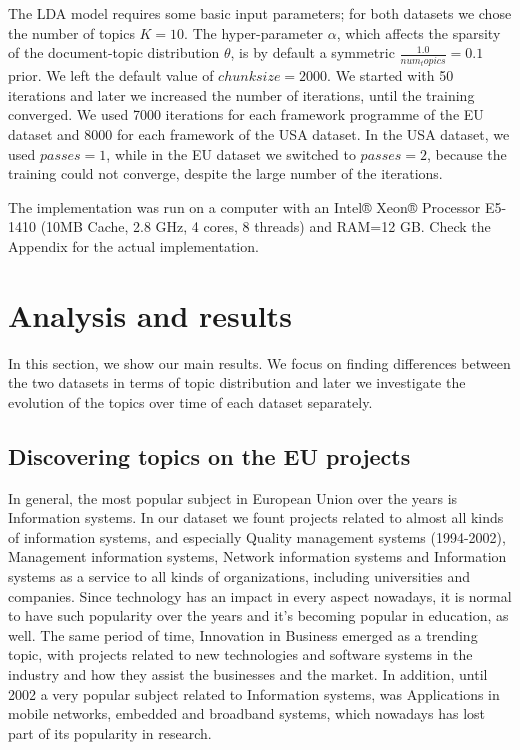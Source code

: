 \documentclass[12pt]{report}
\begin{document}
The LDA model requires some basic input parameters; for both datasets we chose
the number of topics $K=10$. The hyper-parameter $\alpha$, which affects the
sparsity of the document-topic distribution $\theta$, is by default a symmetric
$\frac{1.0}{num_topics} = 0.1$ prior. We left the default value of $chunksize=2000$. We
started with 50 iterations and later we increased the number of iterations,
until the training converged. We used 7000 iterations for each framework
programme of the EU dataset and 8000 for each framework of the USA dataset. In
the USA dataset, we used $passes=1$, while in the EU dataset we switched to
$passes=2$, because the training could not converge, despite the large number of
the iterations.

The implementation was run on a computer with an Intel® Xeon® Processor E5-1410
(10MB Cache, 2.8 GHz, 4 cores, 8 threads) and RAM=12 GB. Check the Appendix for 
the actual implementation.


\section{Analysis and results}

In this section, we show our main results. We focus on finding differences
between the two datasets in terms of topic distribution and later we 
investigate the evolution of the topics over time of each dataset separately.


\subsection{Discovering topics on the EU projects}

In general, the most popular subject in European Union over the years is
Information systems. In our dataset we fount projects related to almost all
kinds of information systems, and especially Quality management systems
(1994-2002), Management information systems, Network information systems and
Information systems as a service to all kinds of organizations, including
universities and companies. Since technology has an impact in every aspect
nowadays, it is normal to have such popularity over the years and it's becoming
popular in education, as well. The same period of time, Innovation in Business
emerged as a trending topic, with projects related to new technologies and
software systems in the industry and how they assist the businesses and the
market. In addition, until 2002 a very popular subject related to Information
systems, was Applications in mobile networks, embedded and broadband systems,
which nowadays has lost part of its popularity in research.
\end{document}
